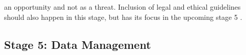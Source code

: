 an opportunity and not as a threat. Inclusion of legal and ethical guidelines should also happen in this stage, but has its focus in the upcoming stage 5 \autocite{fraislCitizenScienceEnvironmental2022, ifrcCommunityBasedSurveillanceGuiding2017,minkmanCitizenScienceWater2015}.

\subsection{Stage 5: Data Management}

